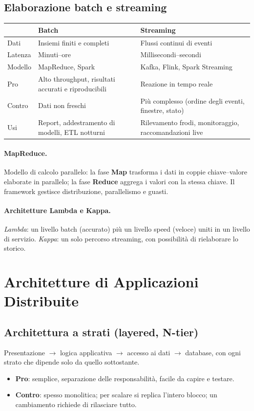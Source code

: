 \subsection{Elaborazione batch e streaming}
\begin{center}
\begin{tabularx}{\textwidth}{@{}lXX@{}}
\toprule
 & \textbf{Batch} & \textbf{Streaming} \\
\midrule
Dati & Insiemi finiti e completi & Flussi continui di eventi \\
Latenza & Minuti--ore & Millisecondi--secondi \\
Modello & MapReduce, Spark & Kafka, Flink, Spark Streaming \\
Pro & Alto throughput, risultati accurati e riproducibili & Reazione in tempo reale \\
Contro & Dati non freschi & Più complesso (ordine degli eventi, finestre, stato) \\
Usi & Report, addestramento di modelli, ETL notturni & Rilevamento frodi, monitoraggio, raccomandazioni live \\
\bottomrule
\end{tabularx}
\end{center}

\paragraph{MapReduce.} Modello di calcolo parallelo: la fase \textbf{Map} trasforma i dati in coppie chiave--valore elaborate in parallelo; la fase \textbf{Reduce} aggrega i valori con la stessa chiave. Il framework gestisce distribuzione, parallelismo e guasti.

\paragraph{Architetture Lambda e Kappa.} \emph{Lambda}: un livello batch (accurato) più un livello speed (veloce) uniti in un livello di servizio. \emph{Kappa}: un solo percorso streaming, con possibilità di rielaborare lo storico.

\section{Architetture di Applicazioni Distribuite}

\subsection{Architettura a strati (layered, N-tier)}
Presentazione $\to$ logica applicativa $\to$ accesso ai dati $\to$ database, con ogni strato che dipende solo da quello sottostante.
\begin{itemize}
    \item \textbf{Pro}: semplice, separazione delle responsabilità, facile da capire e testare.
    \item \textbf{Contro}: spesso monolitica; per scalare si replica l'intero blocco; un cambiamento richiede di rilasciare tutto.
\end{itemize}


